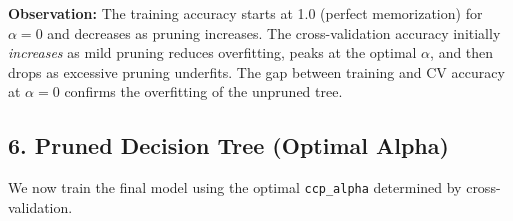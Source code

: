 \documentclass[11pt]{article}
\begin{document}
    \textbf{Observation:} The training accuracy starts at 1.0 (perfect
memorization) for \(\alpha=0\) and decreases as pruning increases. The
cross-validation accuracy initially \emph{increases} as mild pruning
reduces overfitting, peaks at the optimal \(\alpha\), and then drops as
excessive pruning underfits. The gap between training and CV accuracy at
\(\alpha=0\) confirms the overfitting of the unpruned tree.

    \subsection{6. Pruned Decision Tree (Optimal
Alpha)}\label{pruned-decision-tree-optimal-alpha}

We now train the final model using the optimal \texttt{ccp\_alpha}
determined by cross-validation.
\end{document}
